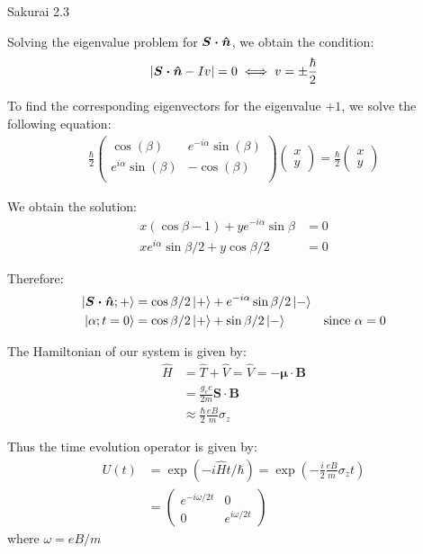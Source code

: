 \documentclass{article}
\newcommand{\bs}{\boldsymbol}
\begin{document}
\begin{section}{Sakurai 2.3}
\begin{enumerate}
\begin{tcolorbox}[breakable]
		Solving the eigenvalue problem for $\boldsymbol{S \cdot \hat{n}}$, we obtain the condition:
		\begin{align*}
			|\boldsymbol{S \cdot \hat{n}} - Iv| = 0 \iff v = \pm \frac{\hbar}{2}
		\end{align*}

		To find the corresponding eigenvectors for the eigenvalue $+1$, we solve the following equation:
		\begin{align*}
			\frac{\hbar}{2}
			\left(
			\begin{array}{cc}
					\cos (\beta )              & e^{-i \alpha} \sin (\beta ) \\
					e^{i \alpha} \sin (\beta ) & -\cos (\beta )              \\
				\end{array}
			\right)
			\begin{pmatrix}
				x \\
				y
			\end{pmatrix}
			= \frac{\hbar}{2}
			\begin{pmatrix}
				x \\
				y
			\end{pmatrix}
		\end{align*}

		We obtain the solution:
		\begin{align*}
			x (\cos{\beta} -1) + y e^{-i \alpha} \sin{\beta}    & = 0 \\
			x e^{i \alpha} \sin{\beta / 2}  + y \cos{\beta / 2} & = 0
		\end{align*}

		Therefore:
		\begin{align*}
			\ket{\boldsymbol{S \cdot \hat{n}}; +}        & = \cos{\beta / 2} \ket{+} + e^{-i \alpha} \sin{\beta / 2} \ket{-}                             \\
			\ket{\alpha; t=0} & = \cos{\beta / 2} \ket{+} + \sin{\beta / 2} \ket{-}               & \text{since $\alpha = 0$}
		\end{align*}

		The Hamiltonian of our system is given by:
		\begin{align*}
			\hat{H} & = \hat{T} + \hat{V} = \hat{V} = - \bs{\mu \cdot B} \\
			        & = \frac{g_e e}{2m} \bs{S \cdot B}                  \\
			        & \approx \frac{\hbar}{2} \frac{eB}{m} \sigma_z
		\end{align*}

		Thus the time evolution operator is given by:
		\begin{align*}
			U(t) & = \exp \left(-i \hat{H} t / \hbar \right)  = \exp \left(-\frac{i}{2} \frac{eB}{m} \sigma_z t \right) \\
			     & = \begin{pmatrix}
				         e^{-i \omega/2 t} & 0                \\
				         0                 & e^{i \omega/2 t}
			         \end{pmatrix}
		\end{align*}
		where $\omega = eB/m$


\end{tcolorbox}
\end{enumerate}
\end{section}
\end{document}

